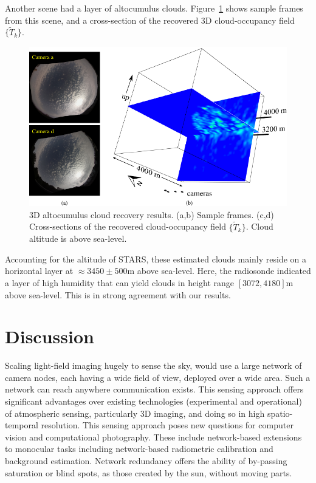 \documentclass[runningheads]{llncs}
\begin{document}
Another scene had a layer of altocumulus clouds. Figure~\ref{fig:alto} shows sample frames from this scene, and a cross-section of the recovered 3D cloud-occupancy field $\{\tilde T_k\}$.
\begin{figure}[t!]
\begin{center}
   \includegraphics[width=1\linewidth]{altos_reconstructions.pdf}
\end{center}
   \vspace{-0.6cm}
   \caption{3D altocumulus cloud recovery results. (a,b) Sample frames.
   (c,d)  Cross-sections of the recovered cloud-occupancy field $\{\tilde T_k\}$. Cloud
   altitude is above sea-level.}
\label{fig:alto}
\end{figure}
Accounting for the altitude of STARS, these estimated clouds mainly reside on a horizontal layer at $\approx 3450\pm500$m above sea-level. Here, the radiosonde indicated a layer of high humidity that can yield clouds in height range $[3072,4180]$m above sea-level. This is in strong agreement with our results.



\section{Discussion}
\label{sec:discuss}

Scaling light-field imaging hugely to sense the sky, would use  a large network of camera nodes, each having a wide field of view, deployed over a wide area. Such a network can reach anywhere communication exists. This sensing approach offers significant advantages over existing technologies (experimental and operational) of atmospheric sensing, particularly  3D imaging, and doing so in high spatio-temporal resolution. This sensing approach poses new questions for computer vision and computational photography. These include network-based extensions to monocular tasks including network-based radiometric calibration and background estimation. Network redundancy offers the ability of by-passing saturation or blind spots, as those created by the sun, without moving parts.
\end{document}
